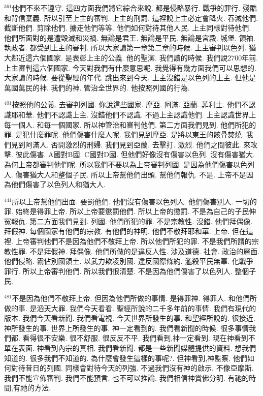 \documentclass{book}
\begin{document}
$^{361}$他們不來不遵守.
這四方面我們將它綜合來說.
都是侵略暴行.
戰爭的罪行.
殘酷和背信棄義.
所以引至上主的審判.
上主的刑罰.
這裡說上主必定會降火.
吞滅他們.
截斷他們.
剪除他們.
擄走他們等等.
他們如何對待其他人民.
上主同樣對待他們.
他們所面對的是遭毀滅和災禍.
無論是君王.
無論是平民.
無論是宮殿.
城堡.
領袖.
執政者.
都受到上主的審判.
所以大家讀第一章第二章的時候.
上主審判以色列.
猶大鄰近這六個國家.
是表彰上主的公義.
他的聖潔.
我們讀的時候.
我們說2700年前.
上主審判這六個國家.
今天對我們有什麼意思呢.
我覺得有幾方面我們可以思想的.
大家讀的時候.
要從聖經的年代.
跳出來到今天.
上主沒錯是以色列的上主.
但他是萬國萬民的神.
我們的神.
管治全世界的.
他按照列國的行為.

$^{401}$按照他的公義.
去審判列國.
你說這些國家.
摩亞.
阿滿.
亞蘭.
菲利士.
他們不認識耶和華.
他們不認識上主.
沒錯他們不認識.
不過上主認識他們.
上主認識世界上每一個人.
和每一個國家.
所以神管治和審判他們.
第二方面我們見到.
他們所犯的罪.
是犯什麼罪呢.
他們傷害什麼人呢.
我們見到摩亞.
是將以東王的骸骨焚燒.
我們見到阿滿人.
否開激烈的刑婦.
我們見到亞蘭.
去擊打.
激烈.
他們之間彼此.
來攻擊.
彼此傷害.
A國對B國.
C國對D國.
但他們好像沒有傷害以色列.
沒有傷害猶大.
為何上帝都審判他們呢.
所以我們不要以為上帝審判列國.
是因為他們傷害以色列人.
傷害猶大人和整個子民.
所以上帝幫他們出頭.
幫他們報仇.
不是.
上帝不是因為他們傷害了以色列人和猶大人.

$^{441}$所以上帝幫他們出面.
要罰他們.
他們沒有傷害以色列人.
他們傷害別人.
一切的罪.
始終是得罪上帝.
所以上帝要懲罰他們.
所以上帝的懲罰.
不是為自己的子民伸冤報仇.
第二方面我們見到.
列國.
他們所犯的罪.
不是宗教性.
沒錯.
他們拜偶像.
拜假神.
每個國家有他們的宗教.
有他們的神明.
他們不敬拜耶和華.
上帝.
但在這裡.
上帝審判他們不是因為他們不敬拜上帝.
所以他們所犯的罪.
不是我們所謂的宗教性罪.
不是拜假神.
拜偶像.
他們所做的是違反人性.
涉及道德.
社會.
政治的層面.
他們侵略.
霸佔別國領土.
以武力欺凌別國.
違反國際條約.
濫殺平民無辜.
化戰爭罪行.
所以上帝審判他們.
所以我們很清楚.
不是因為他們傷害了以色列人.
整個子民.

$^{481}$不是因為他們不敬拜上帝.
但因為他們所做的事情.
是得罪神.
得罪人.
和他們所做的事.
是滔天大罪.
我們今天看看.
聖經所說的二千多年前的事情.
我們有現代的版本.
我們今天看新聞.
我們看電視.
今天世界所發生的事.
和聖經所說的.
很接近.
神所發生的事.
世界上所發生的事.
神一定看到的.
我們看新聞的時候.
很多事情我們都.
看得很不安樂.
很不舒服.
很反反不平.
我們看到,神一定看到.
現在神看到不單在表面.
神看到內宗的真相.
我們看新聞.
都是一些新聞媒體提供的資料.
想我們知道的.
很多我們不知道的.
為什麼會發生這樣的事呢?.
但神看到,神監察.
他們如何對待昔日的列國.
同樣會對待今天的列強.
不過我們沒有神的啟示.
不像亞摩斯.
我們不能宣佈審判.
我們不能預言.
也不可以推論.
我們相信神賞佛分明.
有祂的時間,有祂的方法.
\end{document}
